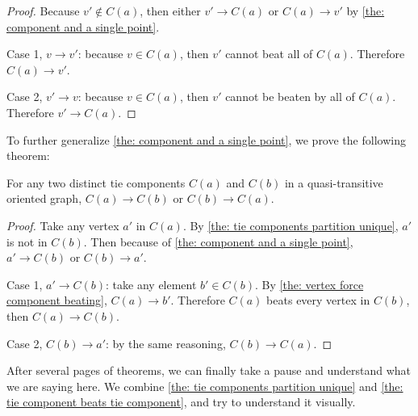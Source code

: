\begin{proof}
  Because \(v' \notin C(a)\),
  then either \(v' \to C(a)\) or \(C(a) \to v'\)
  by \cref{the: component and a single point}.

  Case 1, \(v \to v'\): because \(v \in C(a)\),
  then \(v'\) cannot beat all of \(C(a)\).
  Therefore \(C(a) \to v'\).

  Case 2, \(v' \to v\): because \(v \in C(a)\),
  then \(v'\) cannot be beaten by all of \(C(a)\).
  Therefore \(v' \to C(a)\).
\end{proof}

To further generalize \cref{the: component and a single point},
we prove the following theorem:

\begin{theorem}\label{the: tie component beats tie component}
  For any two distinct tie components \(C(a)\) and \(C(b)\)
  in a quasi-transitive oriented graph,
  \(C(a) \to C(b)\) or \(C(b) \to C(a)\).
\end{theorem}

\begin{proof}
  Take any vertex \(a'\) in \(C(a)\).
  By \cref{the: tie components partition unique}, \(a'\) is not in \(C(b)\).
  Then because of \cref{the: component and a single point},
  \(a' \to C(b)\) or \(C(b) \to a'\).

  Case 1, \(a' \to C(b)\): take any element \(b' \in C(b)\).
  By \cref{the: vertex force component beating}, \(C(a) \to b'\).
  Therefore \(C(a)\) beats every vertex in \(C(b)\),
  then \(C(a) \to C(b)\).

  Case 2, \(C(b) \to a'\):
  by the same reasoning, \(C(b) \to C(a)\).
\end{proof}

After several pages of theorems,
we can finally take a pause
and understand what we are saying here.
We combine \cref{the: tie components partition unique} and
\cref{the: tie component beats tie component},
and try to understand it visually.

